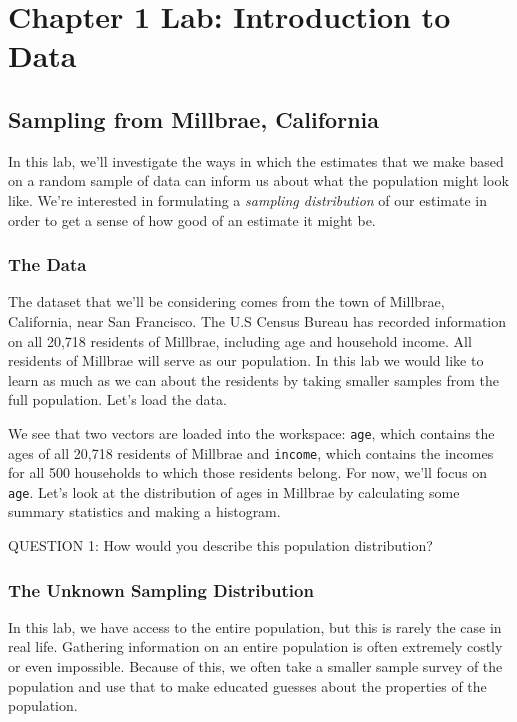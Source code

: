 \documentclass[11pt]{article}
\begin{document}
\section*{Chapter 1 Lab: Introduction to Data}
\subsection*{Sampling from Millbrae, California}

In this lab, we'll investigate the ways in which the estimates that we make based on a random sample of data can inform us about what the population might look like.  We're interested in formulating a \emph{sampling distribution} of our estimate in order to get a sense of how good of an estimate it might be.

\subsubsection*{The Data}
The dataset that we'll be considering comes from the town of Millbrae, California, near San Francisco.  The U.S Census Bureau has recorded information on all 20,718 residents of Millbrae, including age and household income.  All residents of Millbrae will serve as our population.  In this lab we would like to learn as much as we can about the residents by taking smaller samples from the full population.  Let's load the data.


We see that two vectors are loaded into the workspace: \texttt{age}, which contains the ages of all 20,718 residents of Millbrae and \texttt{income}, which contains the incomes for all 500 households to which those residents belong.  For now, we'll focus on \texttt{age}.  Let's look at the distribution of ages in Millbrae by calculating some summary statistics and making a histogram.


QUESTION 1: How would you describe this population distribution?

\subsubsection*{The Unknown Sampling Distribution}
In this lab, we have access to the entire population, but this is rarely the case in real life.  Gathering information on an entire population is often extremely costly or even impossible.  Because of this, we often take a smaller sample survey of the population and use that to make educated guesses about the properties of the population.
\end{document}
